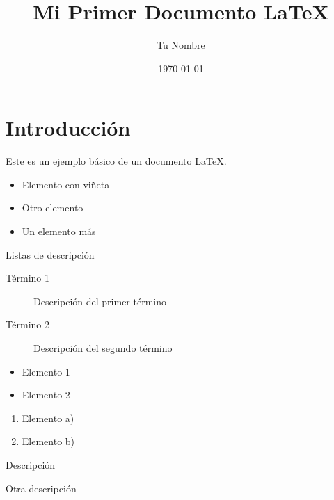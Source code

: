 \documentclass[12pt,a4paper]{book}
\title{Mi Primer Documento LaTeX}
\author{Tu Nombre}
\date{\today}
\begin{document}
	
	\maketitle
	
	\section{Introducción}
	Este es un ejemplo básico de un documento LaTeX.
	
	
	\begin{itemize}
		\item Elemento con viñeta
		\item Otro elemento
		\item Un elemento más
	\end{itemize}
	
	Listas de descripción
	
	\begin{description}
		\item[Término 1] Descripción del primer término
		\item[Término 2] Descripción del segundo término
	\end{description}
	
	
	
	\begin{itemize}[noitemsep,topsep=0pt]
		\item Elemento 1
		\item Elemento 2
	\end{itemize}
	
	\begin{enumerate}[label=\alph*)]
		\item Elemento a)
		\item Elemento b)
	\end{enumerate}
	
	\begin{description}[style=multiline,leftmargin=3cm]
		\item[Término largo] Descripción
		\item[Corto] Otra descripción
	\end{description}
	
\end{document}
